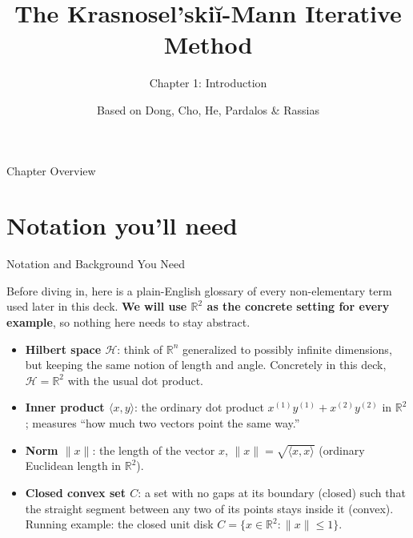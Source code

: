 \documentclass[aspectratio=169,10pt]{beamer}
\title[KM Method -- Ch.1]{The Krasnosel'ski\u{i}-Mann Iterative Method}
\subtitle{Chapter 1: Introduction}
\author{Based on Dong, Cho, He, Pardalos \& Rassias}
\institute{SpringerBriefs in Optimization, 2022}
\date{}
\newcommand{\Hil}{\mathcal{H}}
\newcommand{\R}{\mathbb{R}}
\begin{document}
\begin{frame}
  \titlepage
\end{frame}

\begin{frame}{Chapter Overview}
  \tableofcontents
\end{frame}

\section{Notation you'll need}

\begin{frame}[allowframebreaks]{Notation and Background You Need}

Before diving in, here is a plain-English glossary of every non-elementary
term used later in this deck. \textbf{We will use $\R^2$ as the concrete
setting for every example}, so nothing here needs to stay abstract.

\begin{itemize}
  \item \textbf{Hilbert space $\Hil$}: think of $\R^n$ generalized to
    possibly infinite dimensions, but keeping the same notion of length and
    angle. Concretely in this deck, $\Hil = \R^2$ with the usual dot product.
  \item \textbf{Inner product $\langle x,y\rangle$}: the ordinary dot
    product $x^{(1)}y^{(1)}+x^{(2)}y^{(2)}$ in $\R^2$; measures ``how much
    two vectors point the same way.''
  \item \textbf{Norm $\|x\|$}: the length of the vector $x$,
    $\|x\|=\sqrt{\langle x,x\rangle}$ (ordinary Euclidean length in $\R^2$).
  \item \textbf{Closed convex set $C$}: a set with no gaps at its boundary
    (closed) such that the straight segment between any two of its points
    stays inside it (convex). Running example: the closed unit disk
    $C=\{x\in\R^2:\|x\|\le 1\}$.

\framebreak


\end{itemize}
\end{frame}
\end{document}
